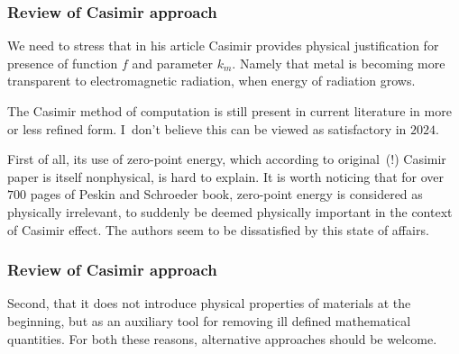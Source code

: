 \documentclass[10pt,t]{beamer}
\begin{document}
\begin{frame}
  \frametitle{Review of Casimir approach}


  We need to stress that in his article Casimir provides physical
  justification for presence of function $f$ and parameter $k_{ m }$.
  Namely that metal is becoming more transparent to electromagnetic
  radiation, when energy of radiation grows.

  The Casimir method of computation is still present in current literature
  in more or less refined form. I~don't believe this can be viewed
  as satisfactory in $2024$.

  First of all, its use of zero-point energy, which according to
  original~(!) Casimir paper is itself nonphysical, is hard to explain.
  It is worth noticing that for over $700$ pages of Peskin and Schroeder
  book, zero-point energy is considered as physically irrelevant, to
  suddenly be deemed physically important in the context of Casimir
  effect. The authors seem to be dissatisfied by this state of affairs.

\end{frame}





\begin{frame}
  \frametitle{Review of Casimir approach}


  Second, that it does not introduce physical properties of materials at the
  beginning, but as an auxiliary tool for removing ill defined mathematical
  quantities. For both these reasons, alternative approaches should be
  welcome.

\end{frame}
\end{document}

